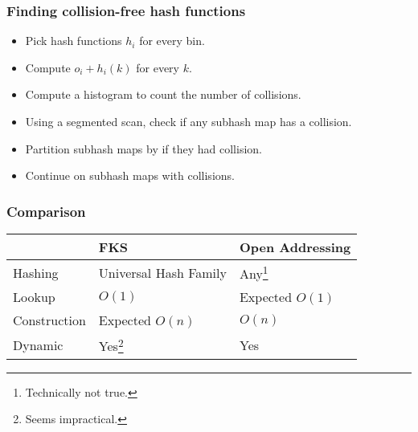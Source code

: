 \documentclass[aspectratio=169]{beamer}
\begin{document}
\begin{frame}\frametitle{Finding collision-free hash functions}
  \begin{itemize}
    \item Pick hash functions $h_i$ for every bin.
    \item Compute $o_i + h_i(k)$ for every $k$.
    \item Compute a histogram to count the number of collisions.
    \item Using a segmented scan, check if any subhash map has a collision.
    \item Partition subhash maps by if they had collision.
    \item Continue on subhash maps with collisions.
  \end{itemize}
\end{frame}


\begin{frame}\frametitle{Comparison}
  \begin{table}
    \begin{tabular}{|l|l|l|}
      \hline
      & FKS & Open Addressing \\ \hline
      Hashing & Universal Hash Family & Any\footnote{Technically not true.} \\ \hline
      Lookup & $O(1)$ & Expected $O(1)$ \\ \hline
      Construction & Expected $O(n)$ & $O(n)$ \\ \hline
      Dynamic & Yes\footnote{Seems impractical.} & Yes \\ \hline
    \end{tabular}
  \end{table}
\end{frame}
\end{document}
